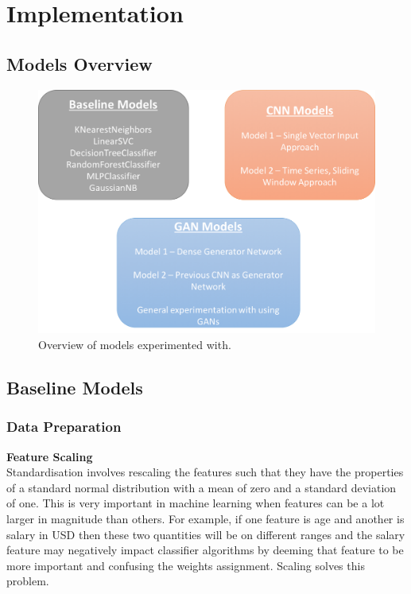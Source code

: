 \documentclass[12pt,a4paper,twoside]{report}
\begin{document}
\chapter{Implementation}
\section{Models Overview}

\begin{figure}[H]
\centering
\includegraphics[scale=0.8]{models_overview}
\caption{Overview of models experimented with.}
\label{fig:models_overview}
\end{figure}

\section{Baseline Models}
\subsection{Data Preparation}

\textbf{Feature Scaling}\\

Standardisation involves rescaling the features such that they have the properties of a standard normal distribution with a mean of zero and a standard deviation of one. This is very important in machine learning when features can be a lot larger in magnitude than others. For example, if one feature is age and another is salary in USD then these two quantities will be on different ranges and the salary feature may negatively impact classifier algorithms by deeming that feature to be more important and confusing the weights assignment. Scaling solves this problem. 
\end{document}
